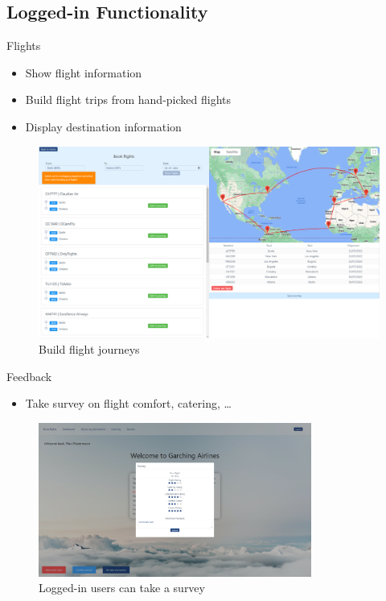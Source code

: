 \documentclass{beamer}
\begin{document}
\subsection{Logged-in Functionality}
\begin{frame}{Flights}
	\begin{itemize}
		\item Show flight information
		\item Build flight trips from hand-picked flights
		\item Display destination information
	\end{itemize}
	\begin{figure}
		\includegraphics[width=.8\textwidth]{../images/BookFlights.png}
		\caption{Build flight journeys}
	\end{figure}
\end{frame}
%
\begin{frame}{Feedback}
	\begin{itemize}
		\item Take survey on flight comfort, catering, \dots
	\end{itemize}
	\begin{figure}
		\includegraphics[width=0.8\textwidth]{../images/survey.png}
		\caption{Logged-in users can take a survey}
	\end{figure}
\end{frame}
%
\end{document}
